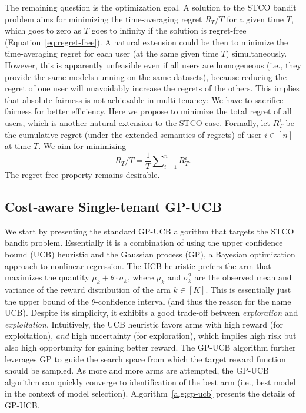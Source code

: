 \documentclass[letterpaper]{vldb}
\begin{document}
The remaining question is the optimization goal.
A solution to the STCO bandit problem aims for minimizing the time-averaging regret $R_T/T$ for a given time $T$, which goes to zero as $T$ goes to infinity if the solution is regret-free (Equation~\ref{eq:regret-free}).
A natural extension could be then to minimize the time-averaging regret for each user (at the same given time $T$) simultaneously.
However, this is apparently unfeasible even if all users are homogeneous (i.e., they provide the same models running on the same datasets), because reducing the regret of one user will unavoidably increase the regrets of the others.
This implies that absolute fairness is not achievable in multi-tenancy: We have to sacrifice fairness for better efficiency.
Here we propose to minimize the total regret of all users, which is another natural extension to the STCO case.
Formally, let $R_T^i$ be the cumulative regret (under the extended semantics of regrets) of user $i\in[n]$ at time $T$.
We aim for minimizing
\begin{equation}\label{eq:time-avg-regret}
R_T/T=\frac{1}{T}\sum\nolimits_{i=1}^n R_T^i.
\end{equation}
The regret-free property remains desirable.

\newpage

\subsection{Cost-aware Single-tenant GP-UCB}

We start by presenting the standard GP-UCB algorithm that targets the STCO bandit problem.
Essentially it is a combination of using the upper confidence bound (UCB) heuristic and the Gaussian process (GP), a Bayesian optimization approach to nonlinear regression.
The UCB heuristic prefers the arm that maximizes the quantity $\mu_k + \theta\cdot\sigma_k$, where $\mu_k$ and $\sigma_k^2$ are the observed mean and variance of the reward distribution of the arm $k\in[K]$.
This is essentially just the upper bound of the $\theta$-confidence interval (and thus the reason for the name UCB).
Despite its simplicity, it exhibits a good trade-off between \emph{exploration} and \emph{exploitation}.
Intuitively, the UCB heuristic favors arms with high reward (for exploitation), \emph{and} high uncertainty (for exploration), which implies high risk but also high opportunity for gaining better reward.
The GP-UCB algorithm further leverages GP to guide the search space from which the target reward function should be sampled.
As more and more arms are attempted, the GP-UCB algorithm can quickly converge to identification of the best arm (i.e., best model in the context of model selection).
Algorithm~\ref{alg:gp-ucb} presents the details of GP-UCB.
\end{document}
